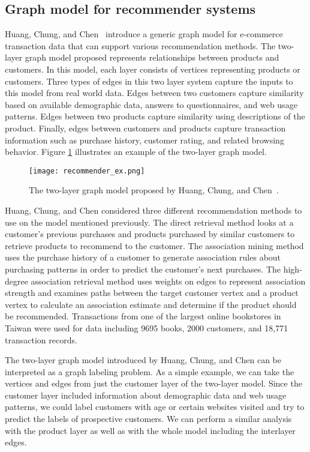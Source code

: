 \subsection{Graph model for recommender systems} Huang, Chung, and Chen~\cite{huang2004graph}
introduce a generic graph model for e-commerce transaction data that can support various
recommendation methods. The two-layer graph model proposed represents relationships between products
and customers. In this model, each layer consists of vertices representing products or customers.
Three types of edges in this two layer system capture the inputs to this model from real world data.
Edges between two customers capture similarity based on available demographic data, answers to
questionnaires, and web usage patterns. Edges between two products capture similarity using
descriptions of the product. Finally, edges between customers and products capture transaction
information such as purchase history, customer rating, and related browsing behavior. Figure
\ref{fig:recommender_example} illustrates an example of the two-layer graph model.

\begin{figure}[h] \centering \texttt{[image: recommender\_ex.png]}
\caption{The two-layer graph model proposed by Huang, Chung, and Chen~\cite{huang2004graph}.}
\label{fig:recommender_example}
\end{figure}

Huang, Chung, and Chen considered three different recommendation
methods to use on the model mentioned previously. The direct retrieval method looks at a customer's
previous purchases and products purchased by similar customers to retrieve products to recommend to
the customer. The association mining method uses the purchase history of a customer to generate
association rules about purchasing patterns in order to predict the customer's next purchases. The
high-degree association retrieval method uses weights on edges to represent association strength and
examines paths between the target customer vertex and a product vertex to calculate an association
estimate and determine if the product should be recommended. Transactions from one of the largest
online bookstores in Taiwan were used for data including 9695 books, 2000 customers, and 18,771
transaction records.

The two-layer graph model introduced by Huang, Chung,
and Chen can be interpreted as a graph labeling problem. As a simple example,
we can take the vertices and edges from just the customer layer of the two-layer model. Since the
customer layer included information about demographic data and web usage patterns, we could label
customers with age or certain websites visited and try to predict the labels of prospective
customers. We can perform a similar analysis with the product layer as well as with the whole model
including the interlayer edges.

